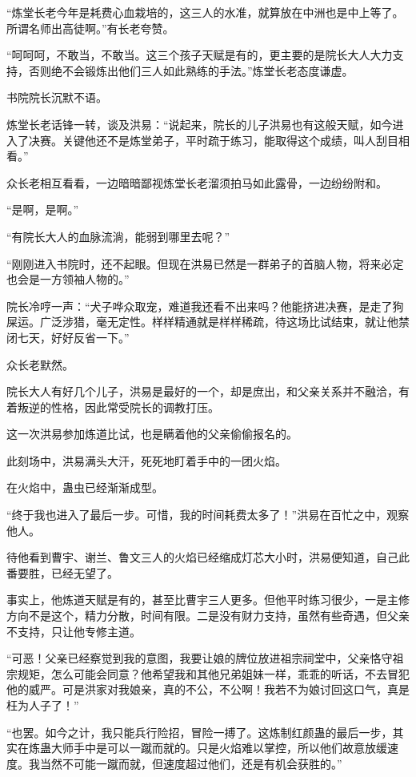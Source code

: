 
\begin{this_body}

“炼堂长老今年是耗费心血栽培的，这三人的水准，就算放在中洲也是中上等了。所谓名师出高徒啊。”有长老夸赞。

“呵呵呵，不敢当，不敢当。这三个孩子天赋是有的，更主要的是院长大人大力支持，否则绝不会锻炼出他们三人如此熟练的手法。”炼堂长老态度谦虚。

书院院长沉默不语。

炼堂长老话锋一转，谈及洪易：“说起来，院长的儿子洪易也有这般天赋，如今进入了决赛。关键他还不是炼堂弟子，平时疏于练习，能取得这个成绩，叫人刮目相看。”

众长老相互看看，一边暗暗鄙视炼堂长老溜须拍马如此露骨，一边纷纷附和。

“是啊，是啊。”

“有院长大人的血脉流淌，能弱到哪里去呢？”

“刚刚进入书院时，还不起眼。但现在洪易已然是一群弟子的首脑人物，将来必定也会是一方领袖人物的。”

院长冷哼一声：“犬子哗众取宠，难道我还看不出来吗？他能挤进决赛，是走了狗屎运。广泛涉猎，毫无定性。样样精通就是样样稀疏，待这场比试结束，就让他禁闭七天，好好反省一下。”

众长老默然。

院长大人有好几个儿子，洪易是最好的一个，却是庶出，和父亲关系并不融洽，有着叛逆的性格，因此常受院长的调教打压。

这一次洪易参加炼道比试，也是瞒着他的父亲偷偷报名的。

此刻场中，洪易满头大汗，死死地盯着手中的一团火焰。

在火焰中，蛊虫已经渐渐成型。

“终于我也进入了最后一步。可惜，我的时间耗费太多了！”洪易在百忙之中，观察他人。

待他看到曹宇、谢兰、鲁文三人的火焰已经缩成灯芯大小时，洪易便知道，自己此番要胜，已经无望了。

事实上，他炼道天赋是有的，甚至比曹宇三人更多。但他平时练习很少，一是主修方向不是这个，精力分散，时间有限。二是没有财力支持，虽然有些奇遇，但父亲不支持，只让他专修主道。

“可恶！父亲已经察觉到我的意图，我要让娘的牌位放进祖宗祠堂中，父亲恪守祖宗规矩，怎么可能会同意？他希望我和其他兄弟姐妹一样，乖乖的听话，不去冒犯他的威严。可是洪家对我娘亲，真的不公，不公啊！我若不为娘讨回这口气，真是枉为人子了！”

“也罢。如今之计，我只能兵行险招，冒险一搏了。这炼制红颜蛊的最后一步，其实在炼蛊大师手中是可以一蹴而就的。只是火焰难以掌控，所以他们故意放缓速度。我当然不可能一蹴而就，但速度超过他们，还是有机会获胜的。”


\end{this_body}
